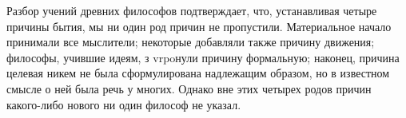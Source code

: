 \documentclass{article}
\begin{document}
Разбор учений древних философов подтверждает, что, устанавливая четыре причины бытия, мы ни один род причин не пропустили. Материальное начало принимали все мыслители; некоторые добавляли также причину движения; философы, учившие идеям, з vrpoнули причину формальную; наконец, причина целевая никем не была сформулирована надлежащим образом, но в известном смысле о ней была речь у многих. Однако вне этих четырех родов причин какого-либо нового ни один философ не указал.
\end{document}
